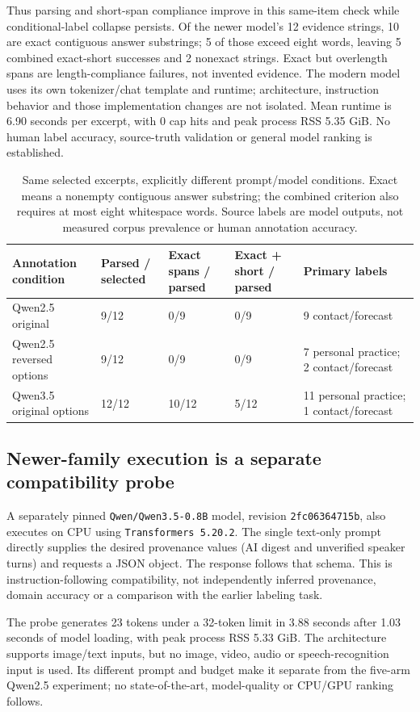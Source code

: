 Thus parsing and short-span compliance improve in this same-item check while conditional-label collapse persists. Of the newer model's 12 evidence strings, 10 are exact contiguous answer substrings; 5 of those exceed eight words, leaving 5 combined exact-short successes and 2 nonexact strings. Exact but overlength spans are length-compliance failures, not invented evidence. The modern model uses its own tokenizer/chat template and runtime; architecture, instruction behavior and those implementation changes are not isolated. Mean runtime is 6.90 seconds per excerpt, with 0 cap hits and peak process RSS 5.35 GiB. No human label accuracy, source-truth validation or general model ranking is established.

\begin{table}[t]
\centering\small\setlength{\tabcolsep}{3pt}
\begin{tabular}{p{}p{}p{}p{}p{}}
\toprule
Annotation condition & Parsed / selected & Exact spans / parsed & Exact + short / parsed & Primary labels \\ \midrule
Qwen2.5 original & 9/12 & 0/9 & 0/9 & 9 contact/forecast \\
Qwen2.5 reversed options & 9/12 & 0/9 & 0/9 & 7 personal practice; 2 contact/forecast \\
Qwen3.5 original options & 12/12 & 10/12 & 5/12 & 11 personal practice; 1 contact/forecast \\
\bottomrule
\end{tabular}
\caption{Same selected excerpts, explicitly different prompt/model conditions. Exact means a nonempty contiguous answer substring; the combined criterion also requires at most eight whitespace words. Source labels are model outputs, not measured corpus prevalence or human annotation accuracy.}
\end{table}

\subsection{Newer-family execution is a separate compatibility probe}

A separately pinned \texttt{Qwen/Qwen3.5-0.8B} model, revision \texttt{2fc06364715b}, also executes on CPU using \texttt{Transformers 5.20.2}. The single text-only prompt directly supplies the desired provenance values (AI digest and unverified speaker turns) and requests a JSON object. The response follows that schema. This is instruction-following compatibility, not independently inferred provenance, domain accuracy or a comparison with the earlier labeling task.

The probe generates 23 tokens under a 32-token limit in 3.88 seconds after 1.03 seconds of model loading, with peak process RSS 5.33 GiB. The architecture supports image/text inputs, but no image, video, audio or speech-recognition input is used. Its different prompt and budget make it separate from the five-arm Qwen2.5 experiment; no state-of-the-art, model-quality or CPU/GPU ranking follows.
